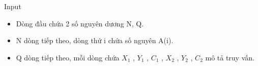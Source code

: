 Input  
\begin{itemize}
	\item      Dòng đầu chứa 2 số nguyên dương N, Q.    
	\item      N dòng tiếp theo, dòng thứ i chứa số nguyên A(i).    
	\item     Q dòng tiếp theo, mỗi dòng chứa $X_{1}$    , $Y_{1}$    , $C_{1}$    , $X_{2}$    , $Y_{2}$    , $C_{2}$    mô tả truy vấn.   
\end{itemize}